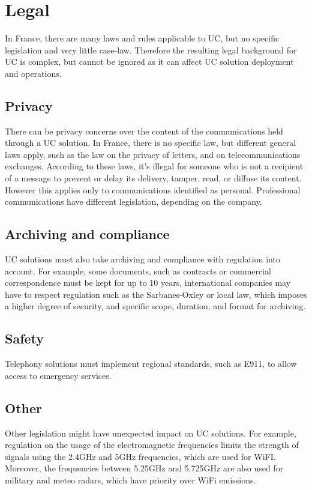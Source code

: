 \section{Legal}\label{background_legal}

In France, there are many laws and rules applicable to UC, but no specific legislation and very little case-law. Therefore the resulting legal background for UC is complex, but cannot be ignored as it can affect UC solution deployment and operations.

\subsection{Privacy}
There can be privacy concerns over the content of the communications held through a UC solution. In France, there is no specific law, but different general laws apply, such as the law on the privacy of letters, and on telecommunications exchanges. According to these laws, it's illegal for someone who is not a recipient of a message to prevent or delay its delivery, tamper, read, or diffuse its content\cite{_atteinte_????,_loi_????,_loi_????-1}. However this applies only to communications identified as personal\cite{_cour_????}. Professional communications have different legislation, depending on the company.


\subsection{Archiving and compliance}
UC solutions must also take archiving and compliance with regulation into account. For example, some documents, such as contracts or commercial correspondence must be kept for up to 10 years\cite{_code_????-1,_code_????-2}, international companies may have to respect regulation such as the Sarbanes-Oxley\cite{_sarbanes-oxley_????} or local law\cite{_loi_2005}, which imposes a higher degree of security, and specific scope, duration, and format for archiving.


\subsection{Safety}
Telephony solutions must implement regional standards, such as E911, to allow access to emergency services\cite{_voip_????}.

\subsection{Other}
Other legislation might have unexpected impact on UC solutions. For example, regulation on the usage of the electromagnetic frequencies limits the strength of signals using the 2.4GHz and 5GHz frequencies, which are used for WiFI. Moreover, the frequencies between 5.25GHz and 5.725GHz are also used for military and meteo radars, which have priority over WiFi emissions\cite{arcep_reseaux_????}.


